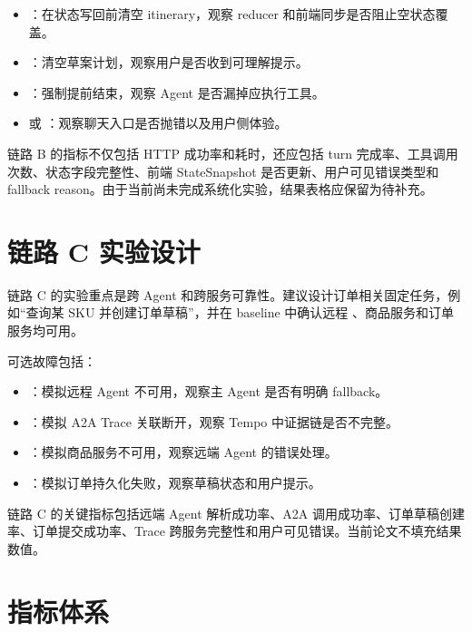 \begin{itemize}
  \item {}：在状态写回前清空 itinerary，观察 reducer 和前端同步是否阻止空状态覆盖。
  \item {}：清空草案计划，观察用户是否收到可理解提示。
  \item {}：强制提前结束，观察 Agent 是否漏掉应执行工具。
  \item {} 或 ：观察聊天入口是否抛错以及用户侧体验。
\end{itemize}

链路 B 的指标不仅包括 HTTP 成功率和耗时，还应包括 turn 完成率、工具调用次数、状态字段完整性、前端 StateSnapshot 是否更新、用户可见错误类型和 fallback reason。由于当前尚未完成系统化实验，结果表格应保留为待补充。

\section{链路 C 实验设计}

链路 C 的实验重点是跨 Agent 和跨服务可靠性。建议设计订单相关固定任务，例如“查询某 SKU 并创建订单草稿”，并在 baseline 中确认远程 、商品服务和订单服务均可用。

可选故障包括：

\begin{itemize}
  \item {}：模拟远程 Agent 不可用，观察主 Agent 是否有明确 fallback。
  \item {}：模拟 A2A Trace 关联断开，观察 Tempo 中证据链是否不完整。
  \item {}：模拟商品服务不可用，观察远端 Agent 的错误处理。
  \item {}：模拟订单持久化失败，观察草稿状态和用户提示。
\end{itemize}

链路 C 的关键指标包括远端 Agent 解析成功率、A2A 调用成功率、订单草稿创建率、订单提交成功率、Trace 跨服务完整性和用户可见错误。当前论文不填充结果数值。

\section{指标体系}

